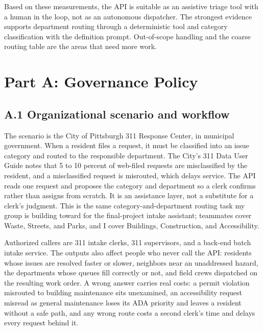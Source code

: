 \documentclass[11pt]{article}
\begin{document}
Based on these measurements, the API is suitable as an assistive triage tool with a human in the loop, not as an autonomous dispatcher. The strongest evidence supports department routing through a deterministic tool and category classification with the definition prompt. Out-of-scope handling and the coarse routing table are the areas that need more work.

\section{Part A: Governance Policy}

\subsection*{A.1 Organizational scenario and workflow}
The scenario is the City of Pittsburgh 311 Response Center, in municipal government. When a resident files a request, it must be classified into an issue category and routed to the responsible department. The City's 311 Data User Guide notes that 5 to 10 percent of web-filed requests are misclassified by the resident, and a misclassified request is misrouted, which delays service. The API reads one request and proposes the category and department so a clerk confirms rather than assigns from scratch. It is an assistance layer, not a substitute for a clerk's judgment. This is the same category-and-department routing task my group is building toward for the final-project intake assistant; teammates cover Waste, Streets, and Parks, and I cover Buildings, Construction, and Accessibility.

Authorized callers are 311 intake clerks, 311 supervisors, and a back-end batch intake service. The outputs also affect people who never call the API: residents whose issues are resolved faster or slower, neighbors near an unaddressed hazard, the departments whose queues fill correctly or not, and field crews dispatched on the resulting work order. A wrong answer carries real costs: a permit violation misrouted to building maintenance sits unexamined, an accessibility request misread as general maintenance loses its ADA priority and leaves a resident without a safe path, and any wrong route costs a second clerk's time and delays every request behind it.
\end{document}
